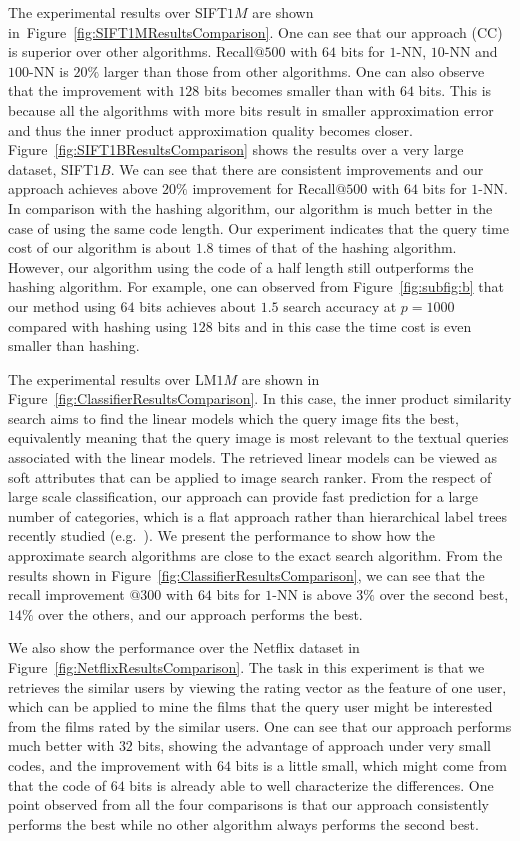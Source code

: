 \documentclass[10pt, letterpaper]{article}
\begin{document}
The experimental results over
SIFT$1M$ are shown in~Figure~\ref{fig:SIFT1MResultsComparison}.
One can see that
our approach (CC)
is superior over other algorithms.
Recall$@500$ with $64$ bits for $1$-NN, $10$-NN
and $100$-NN is $20\%$ larger than those from other algorithms.
One can also observe that
the improvement with $128$ bits becomes smaller
than with $64$ bits.
This is because all the algorithms
with more bits result in smaller approximation error
and thus the inner product approximation quality becomes closer.
Figure~\ref{fig:SIFT1BResultsComparison}
shows the results over a very large dataset, SIFT$1B$.
We can see that there are consistent improvements
and our approach achieves above $20\%$ improvement for Recall$@500$ with $64$ bits for $1$-NN.
In comparison with the hashing algorithm,
our algorithm is much better in the case of using the same code length.
Our experiment indicates that the query time cost of our algorithm
is about $1.8$ times of that of the hashing algorithm.
However,
our algorithm using the code of a half length
still outperforms the hashing algorithm.
For example,
one can observed from Figure~\ref{fig:subfig:b}
that
our method using $64$ bits achieves about $1.5$ search accuracy at $p=1000$ compared with hashing using $128$ bits
and in this case the time cost is even smaller than hashing.

The experimental results over LM$1M$
are shown in Figure~\ref{fig:ClassifierResultsComparison}.
In this case,
the inner product similarity search
aims to find the linear models
which the query image fits the best,
equivalently meaning that
the query image
is most relevant to the textual queries
associated with the linear models.
The retrieved linear models can be viewed as soft attributes
that can be applied to image search ranker.
From the respect of large scale classification,
our approach can provide fast prediction
for a large number of categories,
which is a flat approach
rather than hierarchical label trees recently studied
(e.g.~\cite{DengSBL11}).
We present the performance
to show how the approximate search algorithms are close to the exact search algorithm.
From the results shown in Figure~\ref{fig:ClassifierResultsComparison},
we can see that the recall improvement $@300$ with $64$ bits for $1$-NN
is above $3\%$
over the second best,
$14\%$ over the others,
and our approach performs the best.


We also show the performance over the Netflix dataset
in Figure~\ref{fig:NetflixResultsComparison}.
The task in this experiment
is that we retrieves
the similar users
by viewing the rating vector
as the feature of one user,
which can be applied to
mine the films that the query user might be interested
from the films rated by the similar users.
One can see that our approach performs much better
with $32$ bits,
showing the advantage of approach under very small codes,
and the improvement with $64$ bits is a little small,
which might come from that the code of $64$ bits
is already able to well characterize the differences.
One point observed from all the four comparisons
is that our approach consistently performs the best
while no other algorithm always performs the second best.
\end{document}

